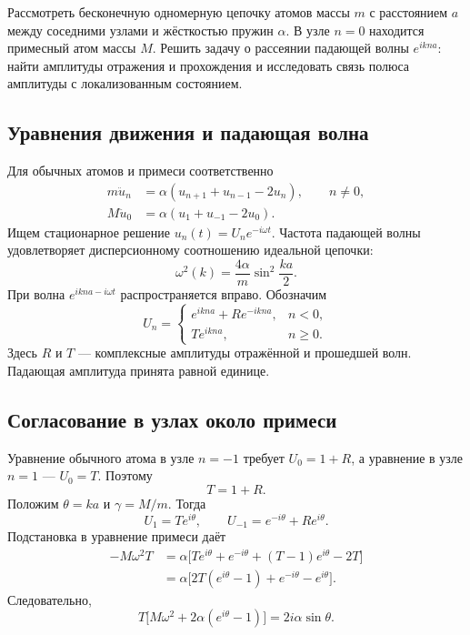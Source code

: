\documentclass[../final.tex]{subfiles}
\begin{document}
\captionsetup{font=footnotesize,labelfont=bf,skip=5pt}

\begingroup
\renewcommand{\thesection}{4.\arabic{section}}


\condition
Рассмотреть бесконечную одномерную цепочку атомов массы $m$
с расстоянием $a$ между соседними узлами и жёсткостью пружин $\alpha$.
В узле $n=0$ находится примесный атом массы $M$.
Решить задачу о рассеянии падающей волны $e^{ikna}$:
найти амплитуды отражения и прохождения и исследовать связь
полюса амплитуды с локализованным состоянием.

\solution

\subsection*{Уравнения движения и падающая волна}

Для обычных атомов и примеси соответственно
\begin{align*}
    m\ddot u_n&=\alpha(u_{n+1}+u_{n-1}-2u_n),\qquad n\ne0,\\
    M\ddot u_0&=\alpha(u_1+u_{-1}-2u_0).
\end{align*}
Ищем стационарное решение $u_n(t)=U_ne^{-i\omega t}$.
Частота падающей волны удовлетворяет дисперсионному соотношению
идеальной цепочки:
\[
    \omega^2(k)=\frac{4\alpha}{m}\sin^2\frac{ka}{2}.
\]
При  волна $e^{ikna-i\omega t}$
распространяется вправо. Обозначим
\[
    U_n=
    \begin{cases}
        e^{ikna}+R e^{-ikna},& n<0,\\
        T e^{ikna},& n\ge0.
    \end{cases}
\]
Здесь $R$ и $T$ --- комплексные амплитуды отражённой и прошедшей волн.
Падающая амплитуда принята равной единице.

\subsection*{Согласование в узлах около примеси}

Уравнение обычного атома в узле $n=-1$ требует
$U_0=1+R$, а уравнение в узле $n=1$ --- $U_0=T$.
Поэтому
\[
    T=1+R.
\]
Положим $\theta=ka$ и $\gamma=M/m$. Тогда
\[
    U_1=T e^{i\theta},\qquad
    U_{-1}=e^{-i\theta}+R e^{i\theta}.
\]
Подстановка в уравнение примеси даёт
\begin{align*}
    -M\omega^2T
       &=\alpha\bigl[T e^{i\theta}+e^{-i\theta}
                         +(T-1)e^{i\theta}-2T\bigr]\\
       &=\alpha\bigl[2T(e^{i\theta}-1)
                         +e^{-i\theta}-e^{i\theta}\bigr].
\end{align*}
Следовательно,
\[
    T\bigl[M\omega^2+2\alpha(e^{i\theta}-1)\bigr]
       =2i\alpha\sin\theta.
\]
\end{document}
